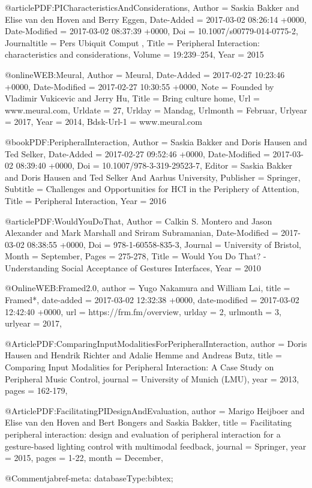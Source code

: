 
@article{PDF:PICharacteristicsAndConsiderations,
	Author = {Saskia Bakker and Elise van den Hoven and Berry Eggen},
	Date-Added = {2017-03-02 08:26:14 +0000},
	Date-Modified = {2017-03-02 08:37:39 +0000},
	Doi = {10.1007/s00779-014-0775-2},
	Journaltitle = {Pers Ubiquit Comput },
	Title = {Peripheral Interaction: characteristics and considerations},
	Volume = {19:239--254},
	Year = {2015}}

@online{WEB:Meural,
	Author = {Meural},
	Date-Added = {2017-02-27 10:23:46 +0000},
	Date-Modified = {2017-02-27 10:30:55 +0000},
	Note = {Founded by Vladimir Vukicevic and Jerry Hu},
	Title = {Bring culture home},
	Url = {www.meural.com},
	Urldate = {27},
	Urlday = {Mandag},
	Urlmonth = {Februar},
	Urlyear = {2017},
	Year = {2014},
	Bdsk-Url-1 = {www.meural.com}}

@book{PDF:PeripheralInteraction,
	Author = {Saskia Bakker and Doris Hausen and Ted Selker},
	Date-Added = {2017-02-27 09:52:46 +0000},
	Date-Modified = {2017-03-02 08:39:40 +0000},
	Doi = {10.1007/978-3-319-29523-7},
	Editor = {Saskia Bakker and Doris Hausen and Ted Selker And Aarhus University},
	Publisher = {Springer},
	Subtitle = {Challenges and Opportunities for HCI in the Periphery of Attention},
	Title = {Peripheral Interaction},
	Year = {2016}}

@article{PDF:WouldYouDoThat,
	Author = {Calkin S. Montero and Jason Alexander and Mark Marshall and Sriram Subramanian},
	Date-Modified = {2017-03-02 08:38:55 +0000},
	Doi = {978-1-60558-835-3},
	Journal = {University of Bristol},
	Month = {September},
	Pages = {275-278},
	Title = {Would You Do That? - Understanding Social Acceptance of Gestures Interfaces},
	Year = {2010}}

@Online{WEB:Framed2.0,
  author        = {Yugo Nakamura and William Lai},
  title         = {Framed*},
  date-added    = {2017-03-02 12:32:38 +0000},
  date-modified = {2017-03-02 12:42:40 +0000},
  url           = {https://frm.fm/overview},
  urlday        = {2},
  urlmonth      = {3},
  urlyear       = {2017},
}

@Article{PDF:ComparingInputModalitiesForPeripheralInteraction,
  author  = {Doris Hausen and Hendrik Richter and Adalie Hemme and Andreas Butz},
  title   = {Comparing Input Modalities for Peripheral Interaction: A Case Study on Peripheral Music Control},
  journal = {University of Munich (LMU)},
  year    = {2013},
  pages   = {162-179},
}

@Article{PDF:FacilitatingPIDesignAndEvaluation,
  author  = {Marigo Heijboer and Elise van den Hoven and Bert Bongers and Saskia Bakker},
  title   = {Facilitating peripheral interaction: design and evaluation of peripheral interaction for a gesture-based lighting control with multimodal feedback},
  journal = {Springer},
  year    = {2015},
  pages   = {1-22},
  month   = {December},
}

@Comment{jabref-meta: databaseType:bibtex;}

